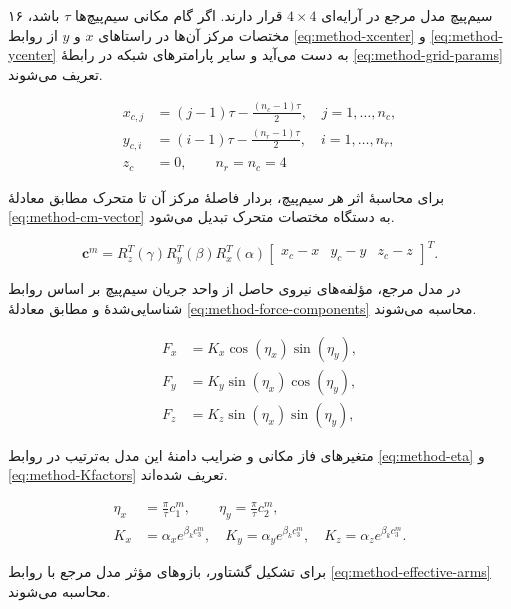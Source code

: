 ۱۶ سیم‌پیچ مدل مرجع در آرایه‌ای $4\times4$ قرار دارند. اگر گام مکانی سیم‌پیچ‌ها $\tau$ باشد، مختصات مرکز آن‌ها در راستاهای $x$ و $y$ از روابط \ref{eq:method-xcenter} و \ref{eq:method-ycenter} به دست می‌آید و سایر پارامترهای شبکه در رابطهٔ \ref{eq:method-grid-params} تعریف می‌شوند.

\begin{align}
	x_{c,j}&=(j-1)\tau-\frac{(n_c-1)\tau}{2},\quad j=1,\ldots,n_c,\label{eq:method-xcenter}\\
	y_{c,i}&=(i-1)\tau-\frac{(n_r-1)\tau}{2},\quad i=1,\ldots,n_r,\label{eq:method-ycenter}\\
	z_c&=0,\qquad n_r=n_c=4
	\label{eq:method-grid-params}
\end{align}

برای محاسبهٔ اثر هر سیم‌پیچ، بردار فاصلهٔ مرکز آن تا متحرک مطابق معادلهٔ \ref{eq:method-cm-vector} به دستگاه مختصات متحرک تبدیل می‌شود.

\begin{equation}
	\mathbf c^{m}=R_z^{T}(\gamma)R_y^{T}(\beta)R_x^{T}(\alpha)
	\begin{bmatrix}x_c-x&y_c-y&z_c-z\end{bmatrix}^{T}.
	\label{eq:method-cm-vector}
\end{equation}

در مدل مرجع، مؤلفه‌های نیروی حاصل از واحد جریان سیم‌پیچ بر اساس روابط شناسایی‌شدهٔ \cite{xuModularMaglevDesign2024d} و مطابق معادلهٔ \ref{eq:method-force-components} محاسبه می‌شوند.

\begin{align}
	F_x&=K_x\cos(\eta_x)\sin(\eta_y),\\
	F_y&=K_y\sin(\eta_x)\cos(\eta_y),\\
	F_z&=K_z\sin(\eta_x)\sin(\eta_y),
	\label{eq:method-force-components}
\end{align}

متغیرهای فاز مکانی و ضرایب دامنهٔ این مدل به‌ترتیب در روابط \ref{eq:method-eta} و \ref{eq:method-Kfactors} تعریف شده‌اند.

\begin{align}
	\eta_x&=\frac{\pi}{\tau}c_1^m,\qquad \eta_y=\frac{\pi}{\tau}c_2^m,\label{eq:method-eta}\\
	K_x&=\alpha_xe^{\beta_kc_3^m},\quad K_y=\alpha_ye^{\beta_kc_3^m},\quad K_z=\alpha_ze^{\beta_kc_3^m}.
	\label{eq:method-Kfactors}
\end{align}

برای تشکیل گشتاور، بازوهای مؤثر مدل مرجع با روابط \ref{eq:method-effective-arms} محاسبه می‌شوند.


